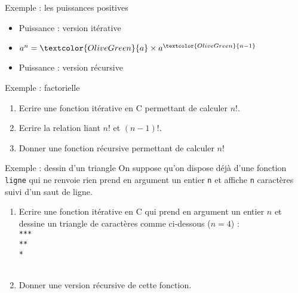 \documentclass[10pt]{beamer}
\begin{document}
\begin{frame}[fragile]{\Ctitle}{\stitle}
	\begin{exampleblock}{Exemple : les puissances positives}
		\begin{itemize}
			\item<1-> \textcolor{OliveGreen}{Puissance : version itérative}
			\item<2-> $a^n = \textcolor{OliveGreen}{a} \times a^{\textcolor{OliveGreen}{n-1}}$
			\item<3-> \textcolor{OliveGreen}{Puissance : version récursive}
		\end{itemize}
	\end{exampleblock}
\end{frame}


\begin{frame}[fragile]{\Ctitle}{\stitle}
    \begin{exampleblock}{Exemple : factorielle}
        \begin{enumerate}
            \item<1-> Ecrire une fonction itérative en C permettant de calculer $n!$.
            \item<2-> Ecrire la relation liant $n!$ et $(n-1)!$.
            \item<3-> Donner une fonction récursive permettant de calculer $n!$
        \end{enumerate}
    \end{exampleblock}
    \begin{exampleblock}{Exemple : dessin d'un triangle}
		\onslide<4->On suppose qu'on dispose déjà d'une fonction {\tt ligne} qui ne renvoie rien prend en argument un entier {\tt n} et affiche {\tt n} caractères {\tt *} suivi d'un saut de ligne.
        \begin{enumerate}
            \item<5-> Ecrire une fonction itérative en C qui prend en argument un entier $n$ et dessine un triangle de caractères 
			{\tt *}comme ci-dessous ($n=4$) : \\
                {\tt ****} \\
                {\tt ***} \\
                {\tt **} \\
                {\tt *} \\
            \item<6-> Donner une version récursive de cette fonction.
        \end{enumerate}
    \end{exampleblock}
\end{frame}
\end{document}
